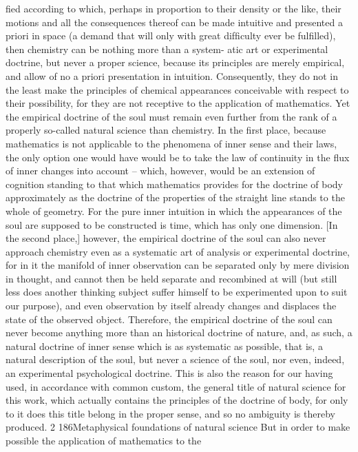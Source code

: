 ﬁed according to which, perhaps in proportion to their density or the like,
their motions and all the consequences thereof can be made intuitive and
presented a priori in space (a demand that will only with great difﬁculty
ever be fulﬁlled), then chemistry can be nothing more than a system-
atic art or experimental doctrine, but never a proper science, because its
principles are merely empirical, and allow of no a priori presentation in
intuition. Consequently, they do not in the least make the principles of
chemical appearances conceivable with respect to their possibility, for
they are not receptive to the application of mathematics.
Yet the empirical doctrine of the soul must remain even further from
the rank of a properly so-called natural science than chemistry. In the
ﬁrst place, because mathematics is not applicable to the phenomena of
inner sense and their laws, the only option one would have would be
to take the law of continuity in the ﬂux of inner changes into account –
which, however, would be an extension of cognition standing to that
which mathematics provides for the doctrine of body approximately as
the doctrine of the properties of the straight line stands to the whole
of geometry. For the pure inner intuition in which the appearances of
the soul are supposed to be constructed is time, which has only one
dimension. [In the second place,] however, the empirical doctrine of the
soul can also never approach chemistry even as a systematic art of analysis
or experimental doctrine, for in it the manifold of inner observation can
be separated only by mere division in thought, and cannot then be held
separate and recombined at will (but still less does another thinking
subject suffer himself to be experimented upon to suit our purpose), and
even observation by itself already changes and displaces the state of the
observed object. Therefore, the empirical doctrine of the soul can never
become anything more than an historical doctrine of nature, and, as
such, a natural doctrine of inner sense which is as systematic as possible,
that is, a natural description of the soul, but never a science of the soul,
nor even, indeed, an experimental psychological doctrine. This is also
the reason for our having used, in accordance with common custom, the
general title of natural science for this work, which actually contains the
principles of the doctrine of body, for only to it does this title belong in
the proper sense, and so no ambiguity is thereby produced. 2
186Metaphysical foundations of natural science
But in order to make possible the application of mathematics to the
